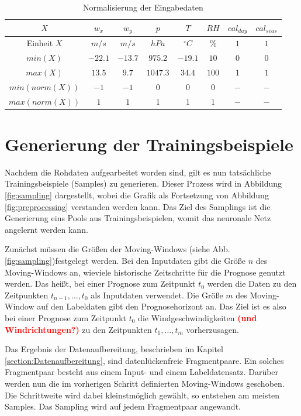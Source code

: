\documentclass[
12pt, %
toc=listofnumbered, %
toc=chapterentrydotfill, %
numbers=noenddot, %
captions=tableheading, %
bibliography=numbered
]{scrreprt}
\let\Oldsection\section
\renewcommand{\section}{\FloatBarrier\Oldsection}
\newcommand{\qm}[1]{\glqq#1\grqq{}} %
\newcommand{\highlight}[1]{\textbf{\textcolor{red}{#1}}}
\begin{document}
\begin{table}[ht]
	\centering
	\caption{Normalisierung der Eingabedaten}
	\begin{tabular}{|c|c|c|c|c|c|c|c|}
		\hline
		\rowcolor{color80}
		\textbf{$X$} & \textbf{$w_x$} & \textbf{$w_y$} & \textbf{$p$} & \textbf{$T$} & \textbf{$RH$} & \textbf{$cal_{day}$} & \textbf{$cal_{seas}$} \\ \hline
		Einheit $X$ & $m/s$ & $m/s$ & $hPa$ & $^\circ C$ & \% & $1$ & $1$ \\ \hline
		$min(X)$       & $-22.1$ & $-13.7$ & $975.2$ & $-19.1$ & $10$ & $0$ & $0$ \\ \hline
		$max(X)$       & $13.5$ & $9.7$ & $1047.3$ & $34.4$ & $100$ & $1$ & $1$ \\ \hline
		$min(norm(X))$ & $-1$ & $-1$ & $0$ & $0$ & $0$ & $-$ & $-$ \\ \hline
		$max(norm(X))$ & $1$ & $1$ & $1$ & $1$ & $1$ & $-$ & $-$ \\ \hline
	\end{tabular}
\label{tab:normalisierung}
\end{table}

\section{Generierung der Trainingsbeispiele}
Nachdem die Rohdaten aufgearbeitet worden sind, gilt es nun tatsächliche Trainingsbeispiele (Samples) zu generieren. Dieser Prozess wird in Abbildung \ref{fig:sampling} dargestellt, wobei die Grafik als Fortsetzung von Abbildung \ref{fig:preprocessing} verstanden werden kann. Das Ziel des Samplings ist die Generierung eins Pools aus Trainingsbeispielen, womit das neuronale Netz angelernt werden kann.

Zunächst müssen die Größen der Moving-Windows (siehe Abb. \ref{fig:sampling})festgelegt werden. Bei den Inputdaten gibt die Größe $n$ des Moving-Windows an, wieviele historische Zeitschritte für die Prognose genutzt werden. Das heißt, bei einer Prognose zum Zeitpunkt $t_0$ werden die Daten zu den Zeitpunkten $t_{n-1}, \dots, t_0$ als Inputdaten verwendet. Die Größe $m$ des Moving-Window auf den Labeldaten gibt den Prognosehorizont an. Das Ziel ist es also bei einer Prognose zum Zeitpunkt $t_0$ die Windgeschwindigkeiten \highlight{(und Windrichtungen?)} zu den Zeitpunkten $t_1, \dots, t_m$ vorherzusagen.

Das Ergebnis der Datenaufbereitung, beschrieben im Kapitel \ref{section:Datenaufbereitung}, sind datenlückenfreie Fragmentpaare. Ein solches Fragmentpaar besteht aus einem Input- und einem Labeldatensatz. Darüber werden nun die im vorherigen Schritt definierten Moving-Windows \qm{geschoben}. Die Schrittweite wird dabei kleinstmöglich gewählt, so entstehen am meisten Samples. Das Sampling wird auf jedem Fragmentpaar angewandt.
\end{document}
